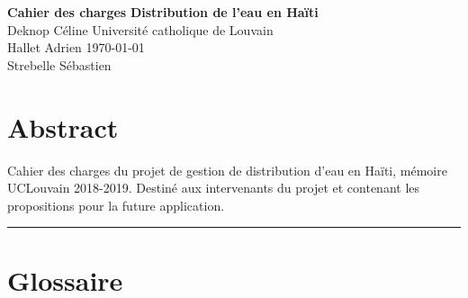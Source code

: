 \documentclass[a4paper, 11pt]{article}
\begin{document}
\noindent
\large\textbf{Cahier des charges} \hfill \textbf{Distribution de l'eau en Haïti} \\
\normalsize Deknop Céline \hfill Université catholique de Louvain \\
Hallet Adrien \hfill \today \\
Strebelle Sébastien

\section*{Abstract}
Cahier des charges du projet de gestion de distribution d'eau en Haïti, mémoire UCLouvain 2018-2019. Destiné aux intervenants du projet et contenant les propositions pour la future application.
\hrule
\section{Glossaire}
\end{document}
